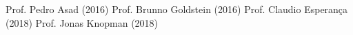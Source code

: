 \documentclass[12pt]{article}
\begin{document}
	
	\begin{thebibliography}{99}
	 Prof. Pedro Asad (2016)
	 Prof. Brunno Goldstein (2016)
	 Prof. Claudio Esperança (2018)
	 Prof. Jonas Knopman (2018)
	\end{thebibliography}
\end{document}
